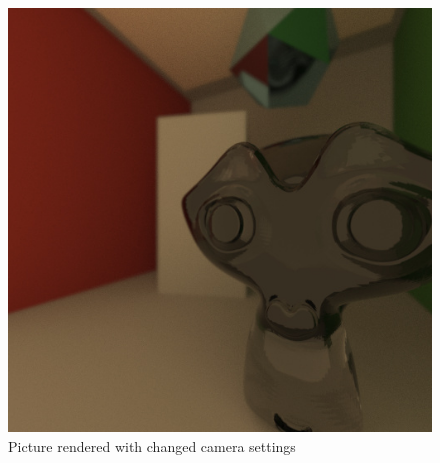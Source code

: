 \documentclass[11pt,a4paper]{article}
\begin{document}
\begin{itemize}
\begin{figure}[H]
\begin{center}
\includegraphics[scale=0.4]{images/changedCameraPosition1000spp}
\caption[Picture showing changed camera settings]{Picture rendered with changed camera settings}
\label{fig:6}
\end{center}
\end{figure}


\end{itemize}
\end{document}
